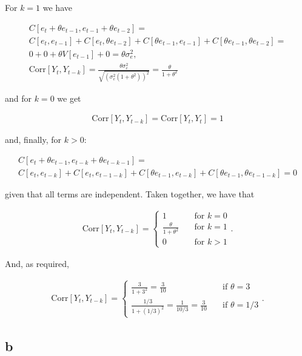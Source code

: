 \documentclass[]{book}
\theoremstyle{definition}
\theoremstyle{definition}
\theoremstyle{remark}
\begin{document}
For \(k = 1\) we have

\begin{gather*}
  C[e_t + \theta e_{t-1}, e_{t-1} + \theta e_{t-2}] = \\
  C[e_t,e_{t-1}] + C[e_t, \theta e_{t-2}] + C[\theta e_{t-1}, e_{t-1}] + C[\theta e_{t-1}, \theta e_{t-2}] = \\
  0 + 0 + \theta V[e_{t-1}] + 0 = \theta \sigma_e^2,\\
  \text{Corr}[Y_t, Y_{t-k}] = \frac{\theta \sigma_e^2}{\sqrt{(\sigma_e^2(1+\theta^2))^2}} = \frac{\theta }{1+\theta^2}
\end{gather*}

and for \(k = 0\) we get

\begin{gather*}
  \text{Corr}[Y_t, Y_{t-k}] = \text{Corr}[Y_t, Y_t] = 1
\end{gather*}

and, finally, for \(k > 0\):

\begin{gather*}
  C[e_t + \theta e_{t-1}, e_{t-k} + \theta e_{t-k-1}] = \\
  C[e_t, e_{t-k}] + C[e_t, e_{t-1-k}] + C[\theta e_{t-1}, e_{t-k}] + C[\theta e_{t-1}, \theta e_{t-1-k}] = 0
\end{gather*}

given that all terms are independent. Taken together, we have that

\begin{gather*} \text{Corr}[Y_t, Y_{t-k}] =
  \begin{cases}
    1                            & \quad \text{for } k = 0\\
    \frac{\theta}{1 + \theta^2}  & \quad \text{for } k = 1\\
    0                            & \quad \text{for } k > 1
  \end{cases}.
\end{gather*}

And, as required,

\begin{gather*}
  \text{Corr}[Y_t, Y_{t-k}] =
  \begin{cases}
    \frac{3}{1+3^2} = \frac{3}{10} & \quad \text{if } \theta = 3\\
    \frac{1/3}{1 + (1/3)^2} = \frac{1}{10/3} = \frac{3}{10}  & \quad \text{if } \theta = 1/3
  \end{cases}.
\end{gather*}

\subsection*{b}\label{b-2}
\end{document}
